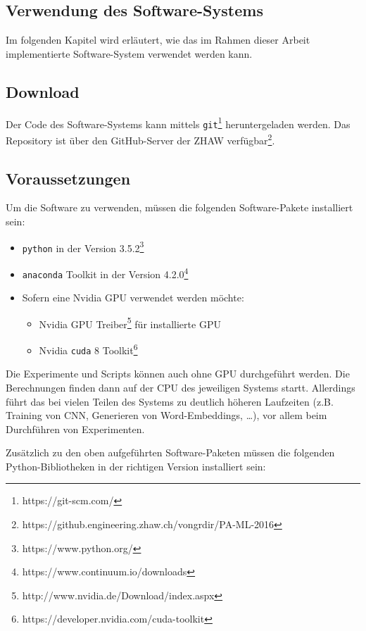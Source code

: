 \begin{appendices}
\chapter{Verwendung des Software-Systems}
Im folgenden Kapitel wird erläutert, wie das im Rahmen dieser Arbeit implementierte Software-System verwendet werden kann.

\section{Download}
Der Code des Software-Systems kann mittels \texttt{git}\footnote{https://git-scm.com/} heruntergeladen werden. Das Repository ist über den GitHub-Server der ZHAW verfügbar\footnote{https://github.engineering.zhaw.ch/vongrdir/PA-ML-2016}.

\section{Voraussetzungen}
Um die Software zu verwenden, müssen die folgenden Software-Pakete installiert sein:

\begin{itemize}[noitemsep]
  \item \texttt{python} in der Version 3.5.2\footnote{https://www.python.org/}
  \item \texttt{anaconda} Toolkit in der Version 4.2.0\footnote{https://www.continuum.io/downloads}
  \item Sofern eine Nvidia GPU verwendet werden möchte:
    \begin{itemize}[noitemsep]
      \item Nvidia GPU Treiber\footnote{http://www.nvidia.de/Download/index.aspx} für installierte GPU
      \item Nvidia \texttt{cuda} 8 Toolkit\footnote{https://developer.nvidia.com/cuda-toolkit}
    \end{itemize}
\end{itemize}

Die Experimente und Scripts können auch ohne GPU durchgeführt werden. Die Berechnungen finden dann auf der CPU des jeweiligen Systems startt. Allerdings führt das bei vielen Teilen des Systems zu deutlich höheren Laufzeiten (z.B. Training von CNN, Generieren von Word-Embeddings, \dots), vor allem beim Durchführen von Experimenten.

Zusätzlich zu den oben aufgeführten Software-Paketen müssen die folgenden Python-Bibliotheken in der richtigen Version installiert sein:


\end{appendices}
